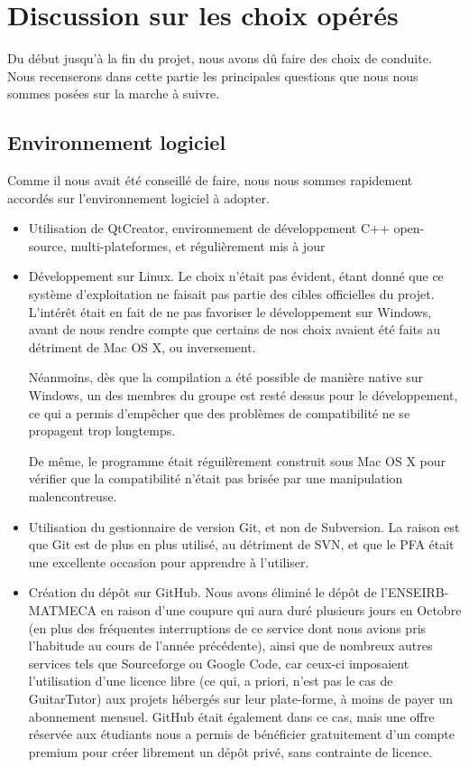 \section{Discussion sur les choix opérés}

Du début jusqu'à la fin du projet, nous avons dû faire des choix de conduite. Nous recenserons dans cette partie les principales questions que nous nous sommes posées sur la marche à suivre.

\subsection{Environnement logiciel}

Comme il nous avait été conseillé de faire, nous nous sommes rapidement accordés sur l'environnement logiciel à adopter.
\begin{itemize}
 \item Utilisation de QtCreator, environnement de développement C++ open-source, multi-plateformes, et régulièrement mis à jour
 \item Développement sur Linux. Le choix n'était pas évident, étant donné que ce système d'exploitation ne faisait pas partie des cibles officielles du projet. L'intérêt était en fait de ne pas favoriser le développement sur Windows, avant de nous rendre compte que certains de nos choix avaient été faits au détriment de Mac OS X, ou inversement.

 Néanmoins, dès que la compilation a été possible de manière native sur Windows, un des membres du groupe est resté dessus
 pour le développement, ce qui a permis d'empêcher que des problèmes de compatibilité ne se propagent trop longtemps.

 De même, le programme était réguilèrement construit sous Mac OS X pour vérifier que la compatibilité n'était pas brisée par une manipulation malencontreuse.
 \item Utilisation du gestionnaire de version Git, et non de Subversion. La raison est que Git est de plus en plus utilisé, au détriment de SVN, et que le PFA était une excellente occasion pour apprendre à l'utiliser.
 \item Création du dépôt sur GitHub. Nous avons éliminé le dépôt de l'ENSEIRB-MATMECA en raison d'une coupure qui aura duré plusieurs jours en Octobre (en plus des fréquentes interruptions de ce service dont nous avions pris l'habitude au cours de l'année précédente), ainsi que de nombreux autres services tels que Sourceforge ou Google Code, car ceux-ci imposaient l'utilisation d'une licence libre (ce qui, a priori, n'est pas le cas de GuitarTutor) aux projets hébergés sur leur plate-forme, à moins de payer un abonnement mensuel. GitHub était également dans ce cas, mais une offre réservée aux étudiants nous a permis de bénéficier gratuitement d'un compte premium pour créer librement un dépôt privé, sans contrainte de licence.
\end{itemize}

